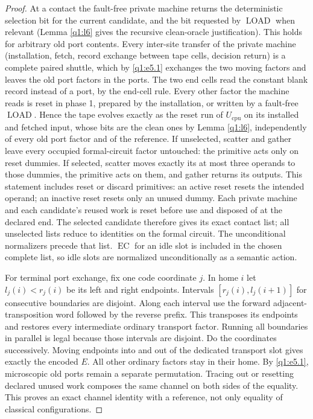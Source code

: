 \begin{proof}
At a contact the fault-free private machine returns the deterministic selection bit for the current candidate, and the bit requested by \(\operatorname{LOAD}\) when relevant (Lemma \ref{q1:l6} gives the recursive clean-oracle justification). This holds for arbitrary old port contents. Every inter-site transfer of the private machine (installation, fetch, record exchange between tape cells, decision return) is a complete paired shuttle, which by \eqref{q1:e5.1} exchanges the two moving factors and leaves the old port factors in the ports. The two end cells read the constant blank record instead of a port, by the end-cell rule. Every other factor the machine reads is reset in phase 1, prepared by the installation, or written by a fault-free \(\operatorname{LOAD}\). Hence the tape evolves exactly as the reset run of \(U_{\mathrm{cpu}}\) on its installed and fetched input, whose bits are the clean ones by Lemma \ref{q1:l6}, independently of every old port factor and of the reference. If unselected, scatter and gather leave every occupied formal-circuit factor untouched: the primitive acts only on reset dummies. If selected, scatter moves exactly its at most three operands to those dummies, the primitive acts on them, and gather returns its outputs. This statement includes reset or discard primitives: an active reset resets the intended operand; an inactive reset resets only an unused dummy. Each private machine and each candidate's reused work is reset before use and disposed of at the declared end. The selected candidate therefore gives its exact contact list; all unselected lists reduce to identities on the formal circuit. The unconditional normalizers precede that list. \(\operatorname{EC}\) for an idle slot is included in the chosen complete list, so idle slots are normalized unconditionally as a semantic action.

For terminal port exchange, fix one code coordinate \(j\). In home \(i\) let \(l_{j}(i)<r_{j}(i)\) be its left and right endpoints. Intervals \([r_{j}(i),l_{j}(i+1)]\) for consecutive boundaries are disjoint. Along each interval use the forward adjacent-transposition word followed by the reverse prefix. This transposes its endpoints and restores every intermediate ordinary transport factor. Running all boundaries in parallel is legal because those intervals are disjoint. Do the coordinates successively. Moving endpoints into and out of the dedicated transport slot gives exactly the encoded \(E\). All other ordinary factors stay in their home. By \eqref{q1:e5.1}, microscopic old ports remain a separate permutation. Tracing out or resetting declared unused work composes the same channel on both sides of the equality. This proves an exact channel identity with a reference, not only equality of classical configurations.


\end{proof}
